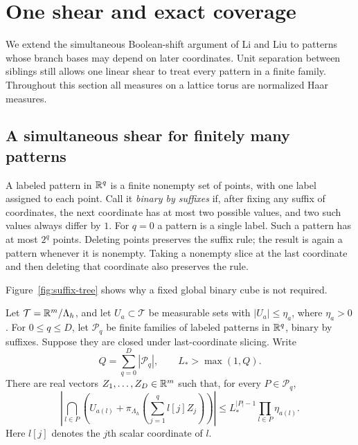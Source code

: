\section{One shear and exact coverage}\label{sec:final}

We extend the simultaneous Boolean-shift argument of Li and Liu
\cite[Theorem~4.3]{LL} to patterns whose branch bases may depend on later
coordinates. Unit separation between siblings still allows one linear
shear to treat every pattern in a finite family. Throughout this section
all measures on a lattice torus are normalized Haar measures.

\subsection{A simultaneous shear for finitely many patterns}

A labeled pattern in $\mathbb R^q$ is a finite nonempty set of points, with one
label assigned to each point. Call it \emph{binary by suffixes} if,
after fixing any suffix of coordinates, the next coordinate has at most
two possible values, and two such values always differ by $1$.
For $q=0$ a pattern is a single label. Such a pattern has at most $2^q$
points. Deleting points preserves the suffix rule; the result is again a
pattern whenever it is nonempty. Taking a nonempty slice at the last
coordinate and then deleting that coordinate also preserves the rule.

Figure~\ref{fig:suffix-tree} shows why a fixed global binary cube is not
required.

\begin{lemma}\label{lem:shear}
Let $\mathcal T=\mathbb R^m/\Lambda_h$, and let $U_a\subset\mathcal T$ be
measurable sets with $|U_a|\le\eta_a$, where $\eta_a>0$.
For $0\le q\le D$, let $\mathcal P_q$ be finite families of labeled
patterns in $\mathbb R^q$, binary by suffixes. Suppose they are closed under
last-coordinate slicing. Write
\[
 Q=\sum_{q=0}^D|\mathcal P_q|,\qquad L_*>\max(1,Q).
\]
There are real vectors $Z_1,\ldots,Z_D\in\mathbb R^m$ such that, for every
$P\in\mathcal P_q$,
\begin{equation}\label{eq:shear-bound}
 \left|\bigcap_{l\in P}
   \left(U_{a(l)}+
     \pi_{\Lambda_h}\left(\sum_{j=1}^q l[j]Z_j\right)\right)\right|
 \le L_*^{|P|-1}\prod_{l\in P}\eta_{a(l)}.
\end{equation}
Here $l[j]$ denotes the $j$th scalar coordinate of $l$.
\end{lemma}

